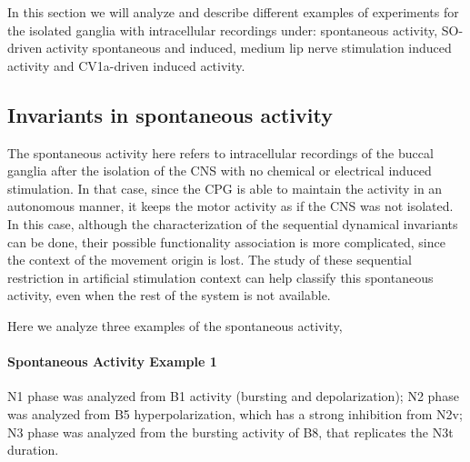
In this section we will analyze and describe different examples of experiments for the isolated ganglia with intracellular recordings under: spontaneous activity, SO-driven activity spontaneous and induced, medium lip nerve stimulation induced activity and CV1a-driven induced activity.



\subsection{Invariants in spontaneous activity}
The spontaneous activity here refers to intracellular recordings of the buccal ganglia after the isolation of the CNS with no chemical or electrical induced stimulation. In that case, since the CPG is able to maintain the activity in an autonomous manner, it keeps the motor activity as if the CNS was not isolated. In this case, although the characterization of the sequential dynamical invariants can be done, their possible functionality association is more complicated, since the context of the movement origin is lost. The study of these sequential restriction in artificial stimulation context can help classify this spontaneous activity, even when the rest of the system is not available. 

Here we analyze three examples of the spontaneous activity, 

\paragraph{Spontaneous Activity Example 1}
N1 phase was analyzed from B1 activity (bursting and depolarization); N2 phase was analyzed from B5 hyperpolarization, which has a strong inhibition from N2v; N3 phase was analyzed from the bursting activity of B8, that replicates the N3t duration. 

